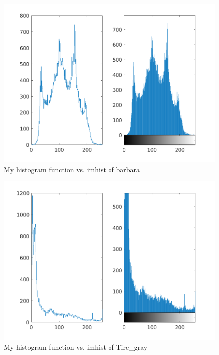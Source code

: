 \begin{figure}[H]
    \centering
    \includegraphics[scale=0.75]{barbara_compare.png}
    \caption{My histogram function vs. imhist of barbara}
\end{figure}

\begin{figure}[H]
    \centering
    \includegraphics[scale=0.75]{Tire_gray_compare.png}
    \caption{My histogram function vs. imhist of Tire\_gray}
\end{figure}

